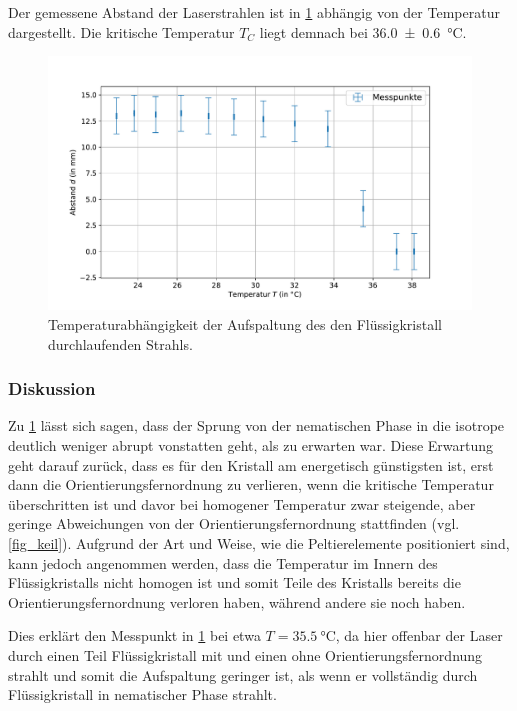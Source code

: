 \documentclass[
	a4paper,
	12pt,
	pagesize,
	ngerman
]{scrartcl}
\begin{document}
	Der gemessene Abstand der Laserstrahlen ist in \cref{fig_laser} abhängig von der Temperatur dargestellt.
	Die kritische Temperatur $T_C$ liegt demnach bei \SI{36.0+-0.6}{\celsius }.
	\begin{figure}[H]
			\includegraphics[width=1\linewidth]{images/laser.pdf}
			\caption{
			Temperaturabhängigkeit der Aufspaltung des den Flüssigkristall durchlaufenden Strahls.
			}
			\label{fig_laser}
	\end{figure}
	\subsubsection{Diskussion}

	Zu \cref{fig_laser} lässt sich sagen, dass der Sprung von der nematischen Phase in die isotrope deutlich weniger abrupt vonstatten geht, als zu erwarten war.
	Diese Erwartung geht darauf zurück, dass es für den Kristall am energetisch günstigsten ist, erst dann die Orientierungsfernordnung zu verlieren, wenn die kritische Temperatur überschritten ist und davor bei homogener Temperatur zwar steigende, aber geringe Abweichungen von der Orientierungsfernordnung stattfinden (vgl. \cref{fig_keil}).
	Aufgrund der Art und Weise, wie die Peltierelemente positioniert sind, kann jedoch angenommen werden, dass die Temperatur im Innern des Flüssigkristalls nicht homogen ist und somit Teile des Kristalls bereits die Orientierungsfernordnung verloren haben, während andere sie noch haben.

	Dies erklärt den Messpunkt in \cref{fig_laser} bei etwa $T= \SI{35,5}{\celsius}$, da hier offenbar der Laser durch einen Teil Flüssigkristall mit und einen ohne Orientierungsfernordnung strahlt und somit die Aufspaltung geringer ist, als wenn er vollständig durch Flüssigkristall in nematischer Phase strahlt.
\end{document}
